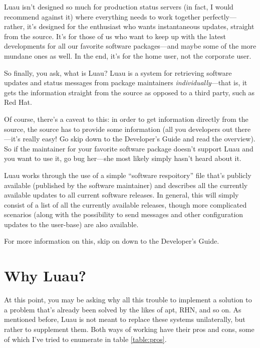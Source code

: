 \documentclass{report}
\begin{document}
Luau isn't designed so much for production status servers (in fact, I would recommend against it) where everything needs to work together perfectly---rather, it's designed for the enthusiast who wants instantaneous updates, straight from the source.  It's for those of us who want to keep up with the latest developments for all our favorite software packages---and maybe some of the more mundane ones as well.  In the end, it's for the home user, not the corporate user.

So finally, you ask, what is Luau?  Luau is a system for retrieving software updates and status messages from package maintainers \emph{individually}---that is, it gets the information straight from the source as opposed to a third party, such as Red Hat.

Of course, there's a caveat to this: in order to get information directly from the source, the source has to provide some information (all you developers out there---it's really easy!  Go skip down to the Developer's Guide and read the overview).  So if the maintainer for your favorite software package doesn't support Luau and you want to use it, go bug her---she most likely simply hasn't heard about it.

Luau works through the use of a simple ``software respoitory'' file that's publicly available (published by the software maintainer) and describes all the currently available updates to all current software releases.  In general, this will simply consist of a list of all the currently available releases, though more complicated scenarios (along with the possibility to send messages and other configuration updates to the user-base) are also available.

For more information on this, skip on down to the Developer's Guide.

\section{Why Luau?}

At this point, you may be asking why all this trouble to implement a solution to a problem that's already been solved by the likes of apt, RHN, and so on.  As mentioned before, Luau is not meant to replace these systems unilaterally, but rather to supplement them.  Both ways of working have their pros and cons, some of which I've tried to enumerate in table \ref{table:pros}.
\end{document}
